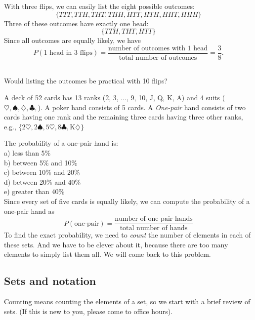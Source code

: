 \ans With three flips, we can easily list the eight possible outcomes:
$$\{TTT, TTH, THT, THH, HTT, HTH, HHT, HHH\}$$
Three of these outcomes have exactly one head:
$$\{TTH, THT, HTT\}$$
Since all outcomes are equally likely, we have
$$P(\text{1 head in 3 flips}) = \frac{\text{number of outcomes with 1 head}}{\text{total number of outcomes}} = \frac{3}{8}.$$ \\

\medskip

Would listing the outcomes be practical with 10 flips?

\medskip

A deck of 52 cards has 13 ranks (2, 3, $\dots$, 9, 10, J, Q, K, A) and 4 suits ($\heartsuit,  \spadesuit, \diamondsuit, \clubsuit,$). A poker hand consists of 5 cards.  
A {\em One-pair} hand consists of two cards having one rank and the remaining three cards having three other ranks, e.g., $\{2 \heartsuit, 2 \spadesuit, 5 \heartsuit, 8 \clubsuit, \text{K} \diamondsuit\}$ 

\medskip

\numexamp The probability of a one-pair hand is: \\
a) less than 5\%\\
b) between 5\% and 10\% \\
c) between 10\% and 20\%\\
d) between 20\% and 40\% \\
e) greater than 40\% \\


Since every set of five cards is equally likely, we can compute the probability of a one-pair hand as
$$P(\text{one-pair}) = \frac{\text{number of one-pair hands}}{\text{total number of hands}}$$
To find the exact probability, we need to {\em count} the number of elements in each of these sets.  And we have to be clever about it, because there are too many elements to simply list them all. We will come back to this problem.


\subsection{Sets and notation}
Counting means counting the elements of a set, so 
we start with a brief review of sets. (If this is new to you, please come to office hours). 

